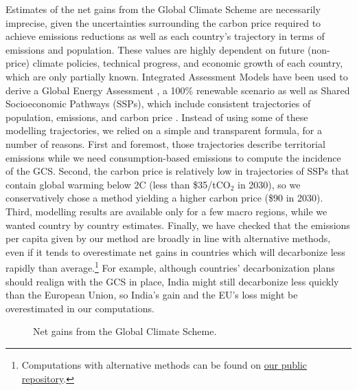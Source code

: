 Estimates of the net gains from the Global Climate Scheme are necessarily imprecise, given the uncertainties surrounding the carbon price required to achieve emissions reductions as well as each country's trajectory in terms of emissions and population. These values are highly dependent on future (non-price) climate policies, technical progress, and economic growth of each country, which are only partially known. Integrated Assessment Models have been used to derive a Global Energy Assessment \citep{johansson_global_2012}, a 100\% renewable scenario \citep{greenpeace_energy_2015} as well as Shared Socioeconomic Pathways (SSPs), which include consistent trajectories of population, emissions, and carbon price \citep{riahi_shared_2017,bauer_shared_2017,van_vuuren_energy_2017,fricko_marker_2017}. Instead of using some of these modelling trajectories, we relied on a simple and transparent formula, for a number of reasons. First and foremost, those trajectories describe territorial emissions while we need consumption-based emissions to compute the incidence of the GCS. Second, the carbon price is relatively low in trajectories of SSPs that contain global warming below 2\textdegree{}C (less than \$35/tCO$_\text{2}$ in 2030), so we conservatively chose a method yielding a higher carbon price (\$90 in 2030). Third, modelling results are available only for a few macro regions, while we wanted country by country estimates. Finally, we have checked that the emissions per capita given by our method are broadly in line with alternative methods, even if it tends to overestimate net gains in countries which will decarbonize less rapidly than average.\footnote{Computations with alternative methods can be found on \href{https://github.com/bixiou/global_tax_attitudes/blob/main/code_global/map_GCS_incidence.R}{our public repository}.} For example, although countries' decarbonization plans should realign with the GCS in place, India might still decarbonize less quickly than the European Union, so India's gain and the EU's loss might be overestimated in our computations. 

\begin{figure}[h!]
    \caption{Net gains from the Global Climate Scheme.}\label{fig:median_gain_2015}
\end{figure}


